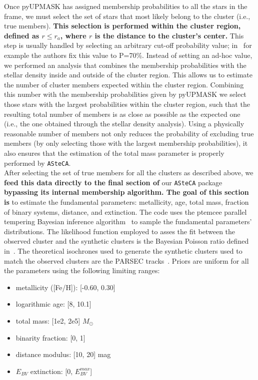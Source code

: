 \documentclass[referee]{aa}
\begin{document}
  Once pyUPMASK has assigned membership probabilities to all the stars in the
  frame, we must select the set of stars that most likely belong to the
  cluster (i.e., true members). \textbf{This selection is performed within the
  cluster region, defined as $r\leq r_{a}$, where $r$ is the distance to the
  cluster's center.}
  This step is usually handled by selecting
  an arbitrary cut-off probability value; in~\cite{Cantat_2020} for example
  the authors fix this value to P=70\%. Instead of setting an ad-hoc value, we
  performed an analysis that combines the membership probabilities with the
  stellar density inside and outside of the cluster region. This allows us to
  estimate the number of cluster members expected within the cluster region.
  Combining this number with the membership probabilities given by pyUPMASK we
  select those stars with the largest probabilities within the cluster region,
  such that the resulting total number of members is as close as possible as the
  expected one (i.e., the one obtained through the stellar density analysis).
  Using a physically reasonable number of members not only reduces the
  probability of excluding true members (by only selecting those with the
  largest membership probabilities), it also ensures that the estimation of the
  total mass parameter is properly performed by \texttt{ASteCA}.\\

  After selecting the set of true members for all the clusters as described
  above, we \textbf{feed this data directly to the final section of} our 
  \texttt{ASteCA} package \textbf{bypassing its internal membership algorithm. 
  The goal of this section is} to estimate
  the fundamental parameters: metallicity, age, total mass, fraction of binary
  systems, distance, and extinction. The code uses the ptemcee parallel
  tempering Bayesian inference algorithm~\citep{ptemcee} to sample the
  fundamental parameters' distributions. The likelihood function employed to
  asses the fit between the observed cluster and the synthetic clusters is the
  Bayesian Poisson ratio defined in~\cite{Tremmel_2013}.
  The theoretical isochrones used to generate the
  synthetic clusters used to match the observed clusters are the PARSEC
  tracks~\citep{Bressan_2012}. Priors are uniform for all the parameters using
  the following limiting ranges:

  \begin{itemize}
   \item metallicity ([Fe/H]): [-0.60, 0.30]
   \item logarithmic age: [8, 10.1]
   \item total mass: [1e2, 2e5] $M_{\odot}$
   \item binarity fraction: [0, 1]
   \item distance modulus: [10, 20] mag
   \item $E_{BV}$ extinction: [0, $E_{BV}^{max}$]
  \end{itemize}
\end{document}
